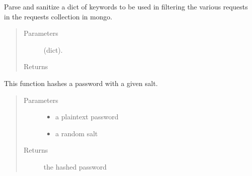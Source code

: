 \documentclass[letterpaper,10pt,english]{sphinxmanual}
\begin{document}

\begin{fulllineitems}
\label{\detokenize{apidoc/utdesign_procurement:utdesign_procurement.utils.getRequestKeywords}}
Parse and sanitize a dict of keywords to be used in filtering the
various requests in the requests collection in mongo.
\begin{quote}\begin{description}
\item[{Parameters}] \leavevmode
{} \textendash{} (dict).

\item[{Returns}] \leavevmode


\end{description}\end{quote}

\end{fulllineitems}


\begin{fulllineitems}
\label{\detokenize{apidoc/utdesign_procurement:utdesign_procurement.utils.hashPassword}}
This function hashes a password with a given salt.
\begin{quote}\begin{description}
\item[{Parameters}] \leavevmode\begin{itemize}
\item {} 
 \textendash{} a plaintext password

\item {} 
 \textendash{} a random salt

\end{itemize}

\item[{Returns}] \leavevmode
the hashed password

\end{description}\end{quote}

\end{fulllineitems}
\end{document}
